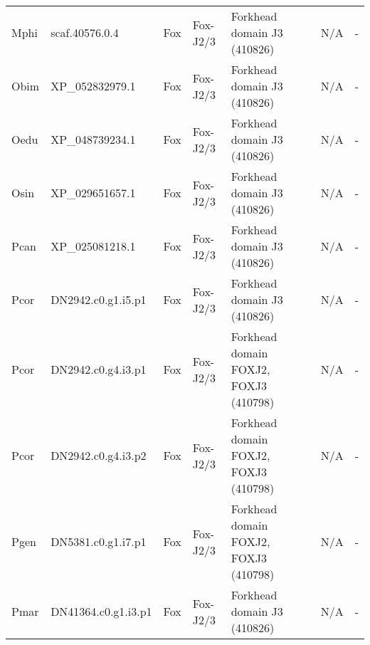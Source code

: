 \documentclass[../main.tex]{subfiles}
\begin{document}
\begin{landscape}
\begin{longtable}{lllllll}
		Mphi           & scaf.40576.0.4        & Fox            & Fox-J2/3            & Forkhead domain J3 (410826)                 & N/A                                                                    & -                    \\
		Obim           & XP\_052832979.1       & Fox            & Fox-J2/3            & Forkhead domain J3 (410826)                 & N/A                                                                    & -                    \\
		Oedu           & XP\_048739234.1       & Fox            & Fox-J2/3            & Forkhead domain J3 (410826)                 & N/A                                                                    & -                    \\
		Osin           & XP\_029651657.1       & Fox            & Fox-J2/3            & Forkhead domain J3 (410826)                 & N/A                                                                    & -                    \\
		Pcan           & XP\_025081218.1       & Fox            & Fox-J2/3            & Forkhead domain J3 (410826)                 & N/A                                                                    & -                    \\
		Pcor           & DN2942.c0.g1.i5.p1    & Fox            & Fox-J2/3            & Forkhead domain J3 (410826)                 & N/A                                                                    & -                    \\
		Pcor           & DN2942.c0.g4.i3.p1    & Fox            & Fox-J2/3            & Forkhead domain FOXJ2, FOXJ3 (410798)       & N/A                                                                    & -                    \\
		Pcor           & DN2942.c0.g4.i3.p2    & Fox            & Fox-J2/3            & Forkhead domain FOXJ2, FOXJ3 (410798)       & N/A                                                                    & -                    \\
		Pgen           & DN5381.c0.g1.i7.p1    & Fox            & Fox-J2/3            & Forkhead domain FOXJ2, FOXJ3 (410798)       & N/A                                                                    & -                    \\
		Pmar           & DN41364.c0.g1.i3.p1   & Fox            & Fox-J2/3            & Forkhead domain J3 (410826)                 & N/A                                                                    & -                    \\

\end{longtable}
\end{landscape}
\end{document}
